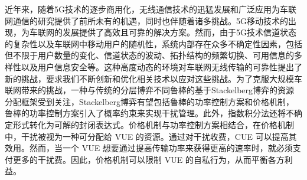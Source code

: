 近年来，随着5G技术的逐步商用化，无线通信技术的迅猛发展和广泛应用为车联网通信的研究提供了前所未有的机遇，同时也伴随着诸多挑战。5G移动技术的出现，为车联网的发展提供了高效且可靠的解决方案。然而，由于5G技术信道状态的复杂性以及车联网中移动用户的随机性，系统内部存在众多不确定性因素，包括但不限于用户数量的变化、信道状态的波动、拓扑结构的频繁切换、可用信息的多样性以及用户信息安全等。这种高度动态的环境对车联网无线传输的可靠性提出了新的挑战，要求我们不断创新和优化相关技术以应对这些挑战。为了克服大规模车联网带来的挑战，一种与传统的分层博弈不同鲁棒的基于Stackelberg博弈的资源分配框架受到关注，Stackelberg博弈有望包括鲁棒的功率控制方案和价格机制，鲁棒的功率控制方案引入了概率约束来实现干扰管理。此外，指数积分法还将不确定形式转化为可解的封闭表达式。价格机制与功率控制方案相结合，在价格机制中，干扰被视为一种可分配给 VUE 的资源。通过对干扰收费，CUE 可以提高其效用。然而，当一个 VUE 想要通过提高传输功率来获得更高的速率时，就必须支付更多的干扰费。因此，价格机制可以限制 VUE 的自私行为，从而平衡各方利益。

